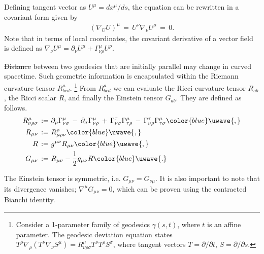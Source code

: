 \documentclass[a4paper,12pt,times,custombib,print,index]{Classes/PhDThesisPSnPDF} %
\providecommand{\DIFadd}[1]{{\protect\color{blue}\uwave{#1}}} %
\providecommand{\DIFdel}[1]{{\protect\color{red}\sout{#1}}}                      %
\providecommand{\DIFaddbegin}{} %
\providecommand{\DIFaddend}{} %
\providecommand{\DIFdelbegin}{} %
\providecommand{\DIFdelend}{} %
\newcommand{\DIFscaledelfig}{0.5}
\newlength{\DIFdelgraphicswidth} %
\newlength{\DIFdelgraphicsheight} %
\newcommand{\DIFaddincludegraphics}[2][]{{\color{blue}\fbox{\DIFOincludegraphics[#1]{#2}}}} %
\newcommand{\DIFdelincludegraphics}[2][]{%
\sbox{\DIFdelgraphicsbox}{\DIFOincludegraphics[#1]{#2}}%
\settoboxwidth{\DIFdelgraphicswidth}{\DIFdelgraphicsbox} %
\settoboxtotalheight{\DIFdelgraphicsheight}{\DIFdelgraphicsbox} %
\scalebox{\DIFscaledelfig}{%
\parbox[b]{\DIFdelgraphicswidth}{\usebox{\DIFdelgraphicsbox}\\[-\baselineskip] \rule{\DIFdelgraphicswidth}{0em}}\llap{\resizebox{\DIFdelgraphicswidth}{\DIFdelgraphicsheight}{%
\setlength{\unitlength}{\DIFdelgraphicswidth}%
\begin{picture}(1,1)%
\thicklines\linethickness{2pt} %
{\color[rgb]{1,0,0}\put(0,0){\framebox(1,1){}}}%
{\color[rgb]{1,0,0}\put(0,0){\line( 1,1){1}}}%
{\color[rgb]{1,0,0}\put(0,1){\line(1,-1){1}}}%
\end{picture}%
}\hspace*{3pt}}} %
} %
\DeclareRobustCommand{\DIFaddbegin}{\DIFOaddbegin \let\includegraphics\DIFaddincludegraphics} %
\DeclareRobustCommand{\DIFaddend}{\DIFOaddend \let\includegraphics\DIFOincludegraphics} %
\DeclareRobustCommand{\DIFdelbegin}{\DIFOdelbegin \let\includegraphics\DIFdelincludegraphics} %
\DeclareRobustCommand{\DIFdelend}{\DIFOaddend \let\includegraphics\DIFOincludegraphics} %
\begin{document}
Defining \DIFaddbegin \DIFadd{the }\DIFaddend tangent vector as $U^\mu = dx^\mu / ds$, the equation can be rewritten in a covariant form given by
\begin{align}
	\left( \nabla_U U \right)^\mu \,=\, U^\nu \nabla_\nu U^\mu \,=\, 0. \label{eqn:geodesic_covariant}
\end{align}
Note that in terms of local coordinates, the covariant derivative of a vector field is defined as $\nabla_\nu U^\mu = \partial_\nu U^\mu + \Gamma^\mu_{\nu\rho} U^\rho$.

\DIFdelbegin \DIFdel{Distance }\DIFdelend \DIFaddbegin \DIFadd{The distance }\DIFaddend between two geodesics that are initially parallel may change in curved spacetime. Such geometric information is encapsulated within the Riemann curvature tensor $R^a_{bcd}$. \footnote{Consider a 1-parameter family of geodesics $\gamma(s,t)$, where $t$ is an affine parameter. The geodesic deviation equation states $T^\rho \nabla_\rho ( T^\nu \nabla_\nu S^\mu ) = R^\mu_{\nu\rho\sigma} T^\nu T^\rho S^\sigma$, where tangent vectors $T=\partial/\partial t$, $S=\partial/\partial s$.} From $R^a_{bcd}$ we can evaluate the Ricci curvature tensor $R_{ab}$, the Ricci scalar $R$, and finally the Einstein tensor $G_{ab}$. They are defined as follows.
\begin{align}
	R^\mu_{\nu\rho\sigma} \,:=& \,\, \partial_\rho \Gamma^\mu_{\nu\sigma} \,-\, \partial_\sigma \Gamma^\mu_{\nu\rho} \,+\, \Gamma^\tau_{\nu\sigma} \Gamma^\mu_{\tau\rho} \,-\, \Gamma^\tau_{\nu\rho} \Gamma^\mu_{\tau\sigma}\DIFaddbegin \DIFadd{,  }\DIFaddend \label{def:Riemann_tensor}\\
	R_{\mu\nu} \,:=& \,\, R^\rho_{\mu\rho\nu}\DIFaddbegin \DIFadd{,  }\DIFaddend \\ R \,:=& \,\, g^{\mu\nu} R_{\mu\nu}\DIFaddbegin \DIFadd{, }\DIFaddend \\
	G_{\mu\nu} \,:=& \,\, R_{\mu\nu} - \frac{1}{2} g_{\mu\nu} R\DIFaddbegin \DIFadd{. }\DIFaddend \label{def:Einstein_tensor}
\end{align}

The Einstein tensor is symmetric, i.e. $G_{\mu\nu} = G_{\nu\mu}$. It is also important to note that its divergence vanishes; $\nabla^\mu G_{\mu\nu} = 0$, which can be proven using the contracted Bianchi identity.
\end{document}

